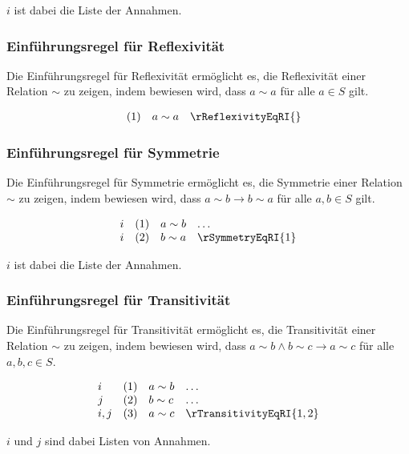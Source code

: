 \documentclass{book}
\theoremstyle{plain}
\theoremstyle{remark}
\theoremstyle{definition}
\begin{document}
\(i\) ist dabei die Liste der Annahmen.

\subsubsection*{Einführungsregel für Reflexivität}
\label{rule:rReflexivityEqRI}
Die Einführungsregel für Reflexivität ermöglicht es, die Reflexivität einer Relation \(\sim\) zu zeigen, indem bewiesen wird, dass \(a \sim a\) für alle \(a \in S\) gilt.

\[
\begin{array}{llll}
      & (1) & a \sim a & \rReflexivityEqRI{}
\end{array}
\]

\subsubsection*{Einführungsregel für Symmetrie}
\label{rule:rSymmetryEqRI}
Die Einführungsregel für Symmetrie ermöglicht es, die Symmetrie einer Relation \(\sim\) zu zeigen, indem bewiesen wird, dass \(a \sim b \rightarrow b \sim a\) für alle \(a, b \in S\) gilt.

\[
\begin{array}{llll}
    i       & (1) & a \sim b & \dots \\
    i       & (2) & b \sim a & \rSymmetryEqRI{1}
\end{array}
\]

\(i\) ist dabei die Liste der Annahmen.

\subsubsection*{Einführungsregel für Transitivität}
\label{rule:rTransitivityEqRI}
Die Einführungsregel für Transitivität ermöglicht es, die Transitivität einer Relation \(\sim\) zu zeigen, indem bewiesen wird, dass \(a \sim b \land b \sim c \rightarrow a \sim c\) für alle \(a, b, c \in S\).

\[
\begin{array}{llll}
    i           & (1) & a \sim b & \dots \\
    j           & (2) & b \sim c & \dots \\
    i,j         & (3) & a \sim c & \rTransitivityEqRI{1,2}
\end{array}
\]

\(i\) und \(j\) sind dabei Listen von Annahmen.
\end{document}

